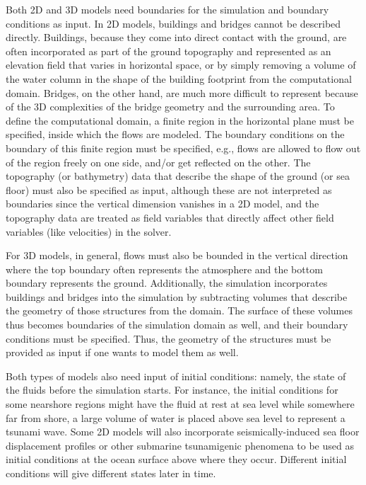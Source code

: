 Both 2D and 3D models need boundaries for the simulation and boundary conditions as input. In 2D models, buildings and bridges cannot be described directly.  Buildings, because they come into direct contact with the ground, are often incorporated as part of the ground topography and represented as an elevation field that varies in horizontal space, or by simply removing a volume of the water column in the shape of the building footprint from the computational domain. Bridges, on the other hand, are much more difficult to represent because of the 3D complexities of the bridge geometry and the surrounding area.  To define the computational domain, a finite region in the horizontal plane must be specified, inside which the flows are modeled. The boundary conditions on the boundary of this finite region must be specified, e.g., flows are allowed to flow out of the region freely on one side, and/or get reflected on the other. The topography (or bathymetry) data that describe the shape of the ground (or sea floor) must also be specified as input, although these are not interpreted as boundaries since the vertical dimension vanishes in a 2D model, and the topography data are treated as field variables that directly affect other field variables (like velocities) in the solver.

For 3D models, in general, flows must also be bounded in the vertical direction where the top boundary often represents the atmosphere and the bottom boundary represents the ground. Additionally, the simulation incorporates buildings and bridges into the simulation by subtracting volumes that describe the geometry of those structures from the domain. The surface of these volumes thus becomes boundaries of the simulation domain as well, and their boundary conditions must be specified. Thus, the geometry of the structures must be provided as input if one wants to model them as well.

Both types of models also need input of initial conditions: namely, the state of the fluids before the simulation starts. For instance, the initial conditions for some nearshore regions might have the fluid at rest at sea level while somewhere far from shore, a large volume of water is placed above sea level to represent a tsunami wave. Some 2D models will also incorporate seismically-induced sea floor displacement profiles or other submarine tsunamigenic phenomena to be used as initial conditions at the ocean surface above where they occur. Different initial conditions will give different states later in time.

